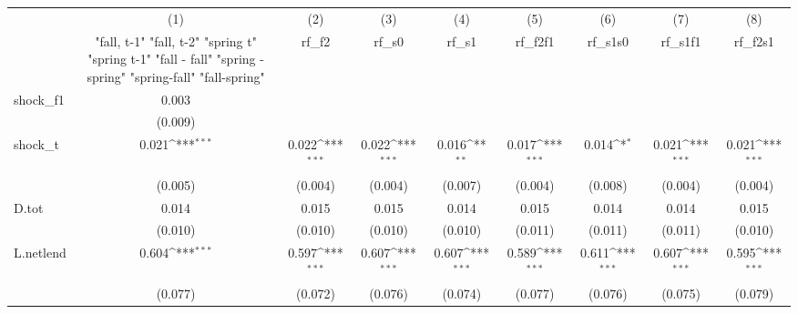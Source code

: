 {
\def\sym#1{\ifmmode^{#1}\else\(^{#1}\)\fi}
\begin{tabular}{l*{8}{c}}
\toprule
            &\multicolumn{1}{c}{(1)}&\multicolumn{1}{c}{(2)}&\multicolumn{1}{c}{(3)}&\multicolumn{1}{c}{(4)}&\multicolumn{1}{c}{(5)}&\multicolumn{1}{c}{(6)}&\multicolumn{1}{c}{(7)}&\multicolumn{1}{c}{(8)}\\
            &\multicolumn{1}{c}{  "fall, t-1" "fall, t-2" "spring t" "spring t-1"  "fall - fall" "spring - spring" "spring-fall" "fall-spring" }&\multicolumn{1}{c}{rf\_f2}&\multicolumn{1}{c}{rf\_s0}&\multicolumn{1}{c}{rf\_s1}&\multicolumn{1}{c}{rf\_f2f1}&\multicolumn{1}{c}{rf\_s1s0}&\multicolumn{1}{c}{rf\_s1f1}&\multicolumn{1}{c}{rf\_f2s1}\\
\midrule
shock\_f1    &       0.003         &                     &                     &                     &                     &                     &                     &                     \\
            &     (0.009)         &                     &                     &                     &                     &                     &                     &                     \\
\addlinespace
shock\_t     &       0.021\sym{***}&       0.022\sym{***}&       0.022\sym{***}&       0.016\sym{**} &       0.017\sym{***}&       0.014\sym{*}  &       0.021\sym{***}&       0.021\sym{***}\\
            &     (0.005)         &     (0.004)         &     (0.004)         &     (0.007)         &     (0.004)         &     (0.008)         &     (0.004)         &     (0.004)         \\
\addlinespace
D.tot       &       0.014         &       0.015         &       0.015         &       0.014         &       0.015         &       0.014         &       0.014         &       0.015         \\
            &     (0.010)         &     (0.010)         &     (0.010)         &     (0.010)         &     (0.011)         &     (0.011)         &     (0.011)         &     (0.010)         \\
\addlinespace
L.netlend   &       0.604\sym{***}&       0.597\sym{***}&       0.607\sym{***}&       0.607\sym{***}&       0.589\sym{***}&       0.611\sym{***}&       0.607\sym{***}&       0.595\sym{***}\\
            &     (0.077)         &     (0.072)         &     (0.076)         &     (0.074)         &     (0.077)         &     (0.076)         &     (0.075)         &     (0.079)         \\

\end{tabular}}
